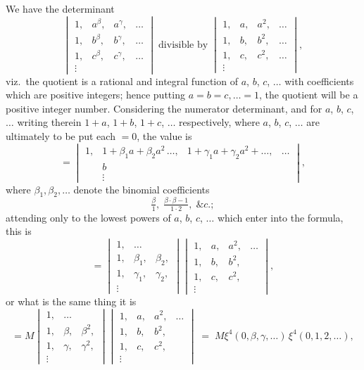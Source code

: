 \documentclass[11pt]{article}
\begin{document}
We have the determinant
\[
\begin{vmatrix} 1, & a^\beta, & a^\gamma, & \ldots\\ 1, & b^\beta, & b^\gamma, & \ldots\\ 1, & c^\beta, & c^\gamma, & \ldots\\ \vdots \end{vmatrix}
\;\text{divisible by}\;
\begin{vmatrix} 1, & a, & a^2, & \ldots\\ 1, & b, & b^2, & \ldots\\ 1, & c, & c^2, & \ldots\\ \vdots \end{vmatrix},
\]
viz.\ the quotient is a rational and integral function of $a$, $b$, $c$, $\ldots$ with coefficients which are positive integers; hence putting $a = b = c, \ldots = 1$, the quotient will be a positive integer number. Considering the numerator determinant, and for $a$, $b$, $c$, $\ldots$ writing therein $1+a$, $1+b$, $1+c$, $\ldots$ respectively, where $a$, $b$, $c$, $\ldots$ are ultimately to be put each $=0$, the value is
\[
=\begin{vmatrix} 1, & 1 + \beta_1 a + \beta_2 a^2\,\ldots, & 1 + \gamma_1 a + \gamma_2 a^2 + \ldots, & \ldots\\ & b & & \\ & \vdots & & \end{vmatrix},
\]
where $\beta_1,\beta_2,\ldots$ denote the binomial coefficients
\[ \tfrac{\beta}{1},\;\tfrac{\beta\cdot\beta-1}{1\cdot 2},\;\&c.; \]
attending only to the lowest powers of $a$, $b$, $c$, $\ldots$ which enter into the formula, this is
\[
=\begin{vmatrix} 1, & \ldots\\ 1, & \beta_1, & \beta_2,\\ 1, & \gamma_1, & \gamma_2,\\ \vdots \end{vmatrix}
\begin{vmatrix} 1, & a, & a^2, & \ldots\\ 1, & b, & b^2,\\ 1, & c, & c^2,\\ \vdots \end{vmatrix},
\]
or what is the same thing it is
\[
= M\begin{vmatrix} 1, & \ldots\\ 1, & \beta, & \beta^2,\\ 1, & \gamma, & \gamma^2,\\ \vdots \end{vmatrix}
\begin{vmatrix} 1, & a, & a^2, & \ldots\\ 1, & b, & b^2,\\ 1, & c, & c^2,\\ \vdots \end{vmatrix}
\;=\;M\xi^4(0,\beta,\gamma,\ldots)\,\xi^4(0,1,2,\ldots),
\]
\end{document}
